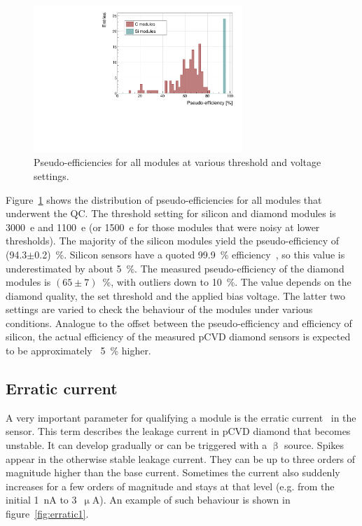 \begin{figure}[!t]
\centering
\includegraphics[width=0.7\textwidth]{../scripts/04_charge_monitoring/plots/pseudoefficiency1} 
\caption{Pseudo-efficiencies for all modules at various threshold and voltage settings.}
\label{fig:pseudoeff}
\end{figure}

Figure~\ref{fig:pseudoeff} shows the distribution of pseudo-efficiencies for all modules that underwent the QC. The threshold setting for silicon and diamond modules is 3000~e and 1100~e (or 1500~e for those modules that were noisy at lower thresholds). The majority of the silicon modules yield the pseudo-efficiency of (94.3$\pm$0.2)~\%. Silicon sensors have a quoted 99.9~\% efficiency~\cite{ATLIBL:00001}, so this value is underestimated by about 5~\%. The measured pseudo-efficiency of the diamond modules is $(65\pm7)$~\%, with outliers down to 10~\%. The value depends on the diamond quality, the set threshold and the applied bias voltage. The latter two settings are varied to check the behaviour of the modules under various conditions. Analogue to the offset between the pseudo-efficiency and efficiency of silicon, the actual efficiency of the measured pCVD diamond sensors is expected to be approximately ~5~\% higher.

\subsection{Erratic current}
A very important parameter for qualifying a module is the erratic current~\cite{Mueller:1175553} in the sensor. This term describes the leakage current in pCVD diamond that becomes unstable. It can develop gradually or can be triggered with a $\upbeta$ source. Spikes appear in the otherwise stable leakage current. They can be up to three orders of magnitude higher than the base current. Sometimes the current also suddenly increases for a few orders of magnitude and stays at that level (e.g. from the initial 1~nA to 3~$\upmu$A). An example of such behaviour is shown in figure~\ref{fig:erratic1}. 

